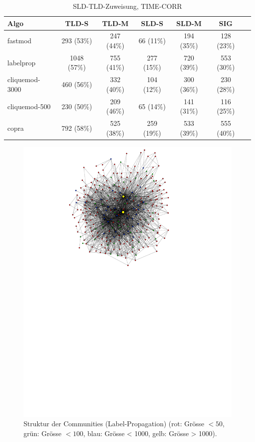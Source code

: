 {\footnotesize
\begin{table}[h]
  \centering
  \begin{tabular}{l|c|c|c|c|c|c}
    Algo & TLD-S & TLD-M & SLD-S & SLD-M & SIG \\
    \hline
    fastmod & 293 (53\%) & 247 (44\%) & 66 (11\%) & 194 (35\%) & 128
    (23\%) \\
    \hline
    labelprop & 1048 (57\%) & 755 (41\%) & 277 (15\%) & 720 (39\%) &
    553 (30\%) \\
    \hline
    cliquemod-3000 & 460 (56\%) & 332 (40\%) & 104 (12\%) & 300 (36\%)
    & 230 (28\%) \\
    \hline
    cliquemod-500 & 230 (50\%) & 209 (46\%) & 65 (14\%) & 141 (31\%) &
    116 (25\%) \\
    \hline
    copra & 792 (58\%) & 525 (38\%) & 259 (19\%) & 533 (39\%) & 555 (40\%)

  \end{tabular}
  \caption{SLD-TLD-Zuweisung, TIME-CORR}
  \label{tab:assign}
\end{table}
}
\begin{figure}[h]
  \centering
  \includegraphics[scale=1.5]{images/label-prop-metagraph-20-narrow-cut.pdf}
  \caption{Struktur der Communities (Label-Propagation) (rot: Gr\"osse
    $<50$, gr\"un: Gr\"osse $<100$, blau: Gr\"osse < 1000, gelb:
    Gr\"osse > 1000).}
  \label{fig:metagraph-com-label}
\end{figure}




